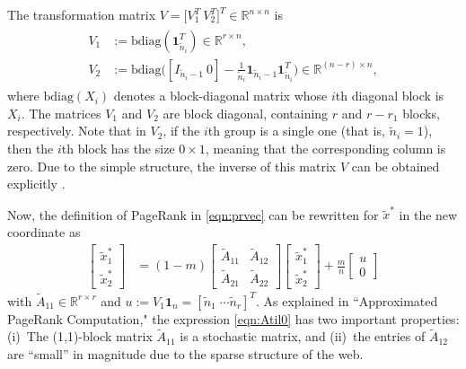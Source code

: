 \documentclass[11pt,draftcls,onecolumn]{IEEEtran}
\newcommand{\field}[1]{{\mathbb{#1}}}
\newcommand{\one}{\mathbf{1}}
\newcommand{\R}{\field{R}}
\begin{document}
The transformation matrix $V = \big[V_1^T~V_2^T\big]^T\in\R^{n\times n}$ is
\begin{align}
\begin{split}
 V_1 &:= \text{bdiag}
            (\one_{\widetilde{n}_i}^T)
            \in\R^{r\times n},\\
 V_2 &:= \text{bdiag}
         \Big(
          [I_{\widetilde{n}_i-1}~0]
            - \frac{1}{\widetilde{n}_i} 
               \one_{\widetilde{n}_i-1}\one_{\widetilde{n}_i}^T
         \Big)
         \in\R^{(n-r)\times n},
\end{split}
\label{eqn:V}
\end{align}
where $\text{bdiag}(X_i)$ denotes a block-diagonal matrix
whose $i$th diagonal block is $X_i$.
The matrices $V_1$ and $V_2$ are block diagonal,
containing $r$ and $r-r_1$ blocks, respectively. 
Note that in $V_2$, if the $i$th group is a single one
(that is, $\widetilde{n}_i=1$), then the $i$th block has the size
$0\times 1$, meaning that the corresponding column is zero. 
Due to the simple structure, the inverse of this matrix $V$ 
can be obtained explicitly \cite{IshTemBai:12}.  



Now, the definition of PageRank in \eqref{eqn:prvec} can 
be rewritten for $\widetilde{x}^*$ in the new coordinate as
\begin{align}
 \begin{bmatrix}
   \widetilde{x}_1^*\\
   \widetilde{x}_2^*
 \end{bmatrix}
  &= (1-m)\begin{bmatrix}
             \widetilde{A}_{11} & \widetilde{A}_{12}\\
             \widetilde{A}_{21} & \widetilde{A}_{22}
          \end{bmatrix}
           \begin{bmatrix}
             \widetilde{x}_1^*\\
             \widetilde{x}_2^*
           \end{bmatrix}
      + \frac{m}{n}
           \begin{bmatrix}
             u\\
             0
           \end{bmatrix}
  \label{eqn:Atil0}
\end{align}
with $\widetilde{A}_{11}\in\R^{r\times r}$ and
$u:=V_1\one_n=[\widetilde{n}_1\;\cdots\widetilde{n}_r]^T$.
%
As explained in ``Approximated PageRank Computation,"
the expression \eqref{eqn:Atil0} has two 
important properties: (i)~The (1,1)-block matrix $\widetilde{A}_{11}$ is 
a stochastic matrix, and (ii)~the entries of $\widetilde{A}_{12}$ are
``small'' in magnitude due to the sparse structure of the web. 
\end{document}
